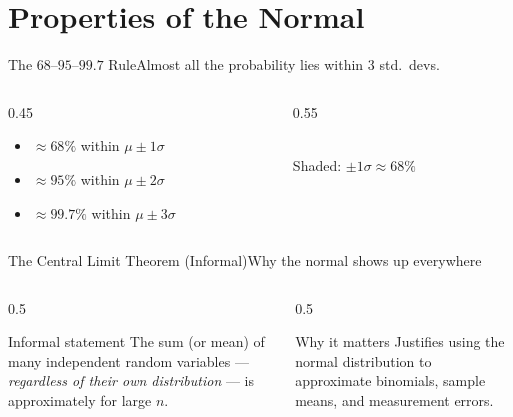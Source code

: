 \documentclass[aspectratio=169,11pt]{beamer}
\begin{document}
\section{Properties of the Normal}

\begin{frame}{The $68$--$95$--$99.7$ Rule}{Almost all the probability lies within 3 std.\ devs.}
  \begin{columns}[T]
    \begin{column}{0.45\textwidth}
      \small
      \begin{itemize}
        \item $\approx 68\%$ within $\mu \pm 1\sigma$
        \item $\approx 95\%$ within $\mu \pm 2\sigma$
        \item $\approx 99.7\%$ within $\mu \pm 3\sigma$
      \end{itemize}
    \end{column}
    \begin{column}{0.55\textwidth}
      \centering
      \\
      \scriptsize Shaded: $\pm 1\sigma \approx 68\%$
    \end{column}
  \end{columns}
\end{frame}

\begin{frame}{The Central Limit Theorem (Informal)}{Why the normal shows up everywhere}
  \begin{columns}[T]
    \begin{column}{0.5\textwidth}
      \begin{block}{Informal statement}
        \small The sum (or mean) of many independent random variables —
        \emph{regardless of their own distribution} — is approximately
         for large $n$.
      \end{block}
    \end{column}
    \begin{column}{0.5\textwidth}
      \begin{exampleblock}{Why it matters}
        \small Justifies using the normal distribution to approximate
        binomials, sample means, and measurement errors.
      \end{exampleblock}
    \end{column}
  \end{columns}
\end{frame}
\end{document}
